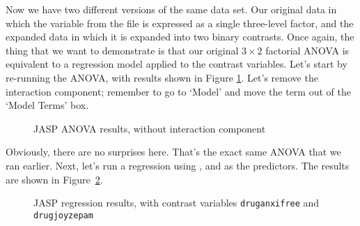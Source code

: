
Now we have two different versions of the same data set. Our original data in which the  variable from the  file is expressed as a single three-level factor, and the expanded data  in which it is expanded into two binary contrasts. Once again, the thing that we want to demonstrate is that our original $3 \times 2$ factorial ANOVA is equivalent to a regression model applied to the contrast variables. Let's start by re-running the ANOVA, with results shown in Figure \ref{fig:factorialanova9}.  Let's remove the interaction component; remember to go to `Model' and move the  term out of the `Model Terms' box.

\begin{figure}[!htb]
\begin{center}
\caption{JASP ANOVA results, without interaction component}
\label{fig:factorialanova9}
\HR
\end{center}
\end{figure}

Obviously, there are no surprises here. That's the exact same ANOVA that we ran earlier. Next, let's run a regression using ,  and  as the predictors. The results are shown in Figure~\ref{fig:factorialanova10}.

\begin{figure}[!htb]
\begin{center}
\caption{JASP regression results, with contrast variables \texttt{druganxifree} and \texttt{drugjoyzepam}}
\label{fig:factorialanova10}
\HR
\end{center}
\end{figure}

